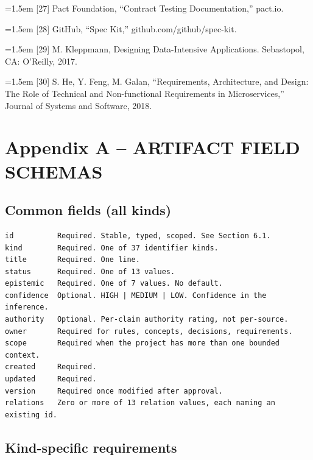 \documentclass[11pt,a4paper]{article}
\begin{document}
\noindent\hangindent=1.5em [27] Pact Foundation, ``Contract Testing Documentation,'' pact.io.

\noindent\hangindent=1.5em [28] GitHub, ``Spec Kit,'' github.com/github/spec-kit.

\noindent\hangindent=1.5em [29] M. Kleppmann, Designing Data-Intensive Applications. Sebastopol, CA: O'Reilly, 2017.

\noindent\hangindent=1.5em [30] S. He, Y. Feng, M. Galan, ``Requirements, Architecture, and Design: The Role of Technical and Non-functional Requirements in Microservices,'' Journal of Systems and Software, 2018.

\appendix
\section{Appendix A -- ARTIFACT FIELD SCHEMAS}

\subsection{Common fields (all kinds)}

\begin{Verbatim}[fontsize=\footnotesize,breaklines=true,breakanywhere=true,breakautoindent=false,samepage=false]
id          Required. Stable, typed, scoped. See Section 6.1.
kind        Required. One of 37 identifier kinds.
title       Required. One line.
status      Required. One of 13 values.
epistemic   Required. One of 7 values. No default.
confidence  Optional. HIGH | MEDIUM | LOW. Confidence in the inference.
authority   Optional. Per-claim authority rating, not per-source.
owner       Required for rules, concepts, decisions, requirements.
scope       Required when the project has more than one bounded context.
created     Required.
updated     Required.
version     Required once modified after approval.
relations   Zero or more of 13 relation values, each naming an existing id.
\end{Verbatim}

\subsection{Kind-specific requirements}
\end{document}
